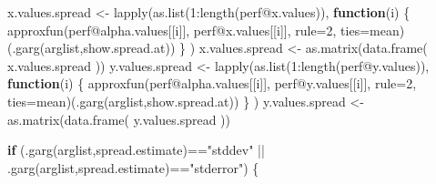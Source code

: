 \documentclass[
  letterpaper,
  DIV=11,
  numbers=noendperiod]{scrartcl}
\newenvironment{Shaded}{\begin{snugshade}}{\end{snugshade}}
\newcommand{\AttributeTok}[1]{\textcolor[rgb]{0.40,0.45,0.13}{#1}}
\newcommand{\ControlFlowTok}[1]{\textcolor[rgb]{0.00,0.23,0.31}{\textbf{#1}}}
\newcommand{\DecValTok}[1]{\textcolor[rgb]{0.68,0.00,0.00}{#1}}
\newcommand{\FunctionTok}[1]{\textcolor[rgb]{0.28,0.35,0.67}{#1}}
\newcommand{\NormalTok}[1]{\textcolor[rgb]{0.00,0.23,0.31}{#1}}
\newcommand{\OtherTok}[1]{\textcolor[rgb]{0.00,0.23,0.31}{#1}}
\newcommand{\SpecialCharTok}[1]{\textcolor[rgb]{0.37,0.37,0.37}{#1}}
\newcommand{\StringTok}[1]{\textcolor[rgb]{0.13,0.47,0.30}{#1}}
\begin{document}
\begin{Shaded}
\begin{Highlighting}[]
\NormalTok{    x.values.spread }\OtherTok{\textless{}{-}}
      \FunctionTok{lapply}\NormalTok{(}\FunctionTok{as.list}\NormalTok{(}\DecValTok{1}\SpecialCharTok{:}\FunctionTok{length}\NormalTok{(perf}\SpecialCharTok{@}\NormalTok{x.values)),}
             \ControlFlowTok{function}\NormalTok{(i) \{}
                 \FunctionTok{approxfun}\NormalTok{(perf}\SpecialCharTok{@}\NormalTok{alpha.values[[i]], perf}\SpecialCharTok{@}\NormalTok{x.values[[i]],}
                           \AttributeTok{rule=}\DecValTok{2}\NormalTok{, }\AttributeTok{ties=}\NormalTok{mean)(}\FunctionTok{.garg}\NormalTok{(arglist,}\StringTok{\textquotesingle{}show.spread.at\textquotesingle{}}\NormalTok{))}
\NormalTok{             \} )}
\NormalTok{    x.values.spread }\OtherTok{\textless{}{-}} \FunctionTok{as.matrix}\NormalTok{(}\FunctionTok{data.frame}\NormalTok{( x.values.spread ))}
\NormalTok{    y.values.spread }\OtherTok{\textless{}{-}}
      \FunctionTok{lapply}\NormalTok{(}\FunctionTok{as.list}\NormalTok{(}\DecValTok{1}\SpecialCharTok{:}\FunctionTok{length}\NormalTok{(perf}\SpecialCharTok{@}\NormalTok{y.values)),}
             \ControlFlowTok{function}\NormalTok{(i) \{}
                 \FunctionTok{approxfun}\NormalTok{(perf}\SpecialCharTok{@}\NormalTok{alpha.values[[i]], perf}\SpecialCharTok{@}\NormalTok{y.values[[i]],}
                           \AttributeTok{rule=}\DecValTok{2}\NormalTok{, }\AttributeTok{ties=}\NormalTok{mean)(}\FunctionTok{.garg}\NormalTok{(arglist,}\StringTok{\textquotesingle{}show.spread.at\textquotesingle{}}\NormalTok{))}
\NormalTok{             \} )}
\NormalTok{    y.values.spread }\OtherTok{\textless{}{-}} \FunctionTok{as.matrix}\NormalTok{(}\FunctionTok{data.frame}\NormalTok{( y.values.spread ))}

    \ControlFlowTok{if}\NormalTok{ (}\FunctionTok{.garg}\NormalTok{(arglist,}\StringTok{\textquotesingle{}spread.estimate\textquotesingle{}}\NormalTok{)}\SpecialCharTok{==}\StringTok{"stddev"} \SpecialCharTok{||}
        \FunctionTok{.garg}\NormalTok{(arglist,}\StringTok{\textquotesingle{}spread.estimate\textquotesingle{}}\NormalTok{)}\SpecialCharTok{==}\StringTok{"stderror"}\NormalTok{) \{}


\end{Highlighting}
\end{Shaded}
\end{document}
